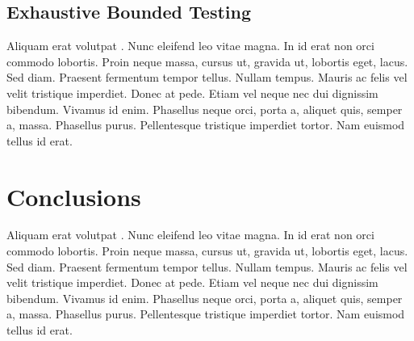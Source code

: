 \documentclass[acmsmall, anonymous]{acmart}
\begin{document}
\subsection{Exhaustive Bounded Testing}

Aliquam erat volutpat \citep{devai2013edsl}. Nunc eleifend leo vitae magna. In id
erat non orci commodo lobortis. Proin neque massa, cursus ut, gravida ut,
lobortis eget, lacus. Sed diam. Praesent fermentum tempor tellus. Nullam tempus.
Mauris ac felis vel velit tristique imperdiet. Donec at pede. Etiam vel neque
nec dui dignissim bibendum. Vivamus id enim. Phasellus neque orci, porta a,
aliquet quis, semper a, massa. Phasellus purus. Pellentesque tristique imperdiet
tortor. Nam euismod tellus id erat.

\section{Conclusions}
\label{sec:conclusions}

Aliquam erat volutpat \citep{devai2013edsl}. Nunc eleifend leo vitae magna. In id
erat non orci commodo lobortis. Proin neque massa, cursus ut, gravida ut,
lobortis eget, lacus. Sed diam. Praesent fermentum tempor tellus. Nullam tempus.
Mauris ac felis vel velit tristique imperdiet. Donec at pede. Etiam vel neque
nec dui dignissim bibendum. Vivamus id enim. Phasellus neque orci, porta a,
aliquet quis, semper a, massa. Phasellus purus. Pellentesque tristique imperdiet
tortor. Nam euismod tellus id erat.









\appendix
\end{document}
